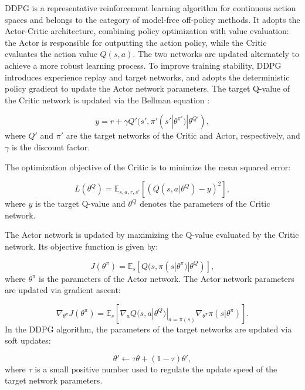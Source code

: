 \documentclass[review]{elsarticle}
\begin{document}
DDPG is a representative reinforcement learning algorithm for continuous action spaces and belongs to the category of model-free off-policy methods. It adopts the Actor-Critic architecture, combining policy optimization with value evaluation: the Actor is responsible for outputting the action policy, while the Critic evaluates the action value $Q(s,a)$. The two networks are updated alternately to achieve a more robust learning process. To improve training stability, DDPG introduces experience replay and target networks, and adopts the deterministic policy gradient to update the Actor network parameters. The target Q-value of the Critic network is updated via the Bellman equation \citep{kaelbling_Reinforcement_1996}:

\begin{equation}\label{eq:bellman}
y = r + \gamma Q'(s', \pi'(s'|\theta^{\pi'})|\theta^{Q'}),
\end{equation}
where $Q'$ and $\pi'$ are the target networks of the Critic and Actor, respectively, and $\gamma$ is the discount factor.

The optimization objective of the Critic is to minimize the mean squared error:

\begin{equation}\label{eq:critic_loss}
L(\theta^Q) = \mathbb{E}_{s,a,r,s'} \left[ (Q(s,a|\theta^Q) - y)^2 \right],
\end{equation}
where $y$ is the target Q-value and $\theta^Q$ denotes the parameters of the Critic network.

The Actor network is updated by maximizing the Q-value evaluated by the Critic network. Its objective function is given by:

\begin{equation}\label{eq:actor_obj}
J(\theta^\pi) = \mathbb{E}_{s} \left[ Q(s, \pi(s|\theta^\pi)|\theta^Q) \right],
\end{equation}
where $\theta^\pi$ is the parameters of the Actor network. The Actor network parameters are updated via gradient ascent:

\begin{equation}\label{eq:actor_grad}
\nabla_{\theta^\pi} J(\theta^\pi) = \mathbb{E}_{s} \left[ \nabla_a Q(s, a|\theta^Q) |_{a=\pi(s)} \nabla_{\theta^\pi} \pi(s|\theta^\pi) \right].
\end{equation}
In the DDPG algorithm, the parameters of the target networks are updated via soft updates:

\begin{equation}\label{eq:soft_update}
\theta' \leftarrow \tau \theta + (1 - \tau) \theta',
\end{equation}
where $\tau$ is a small positive number used to regulate the update speed of the target network parameters.
\end{document}
